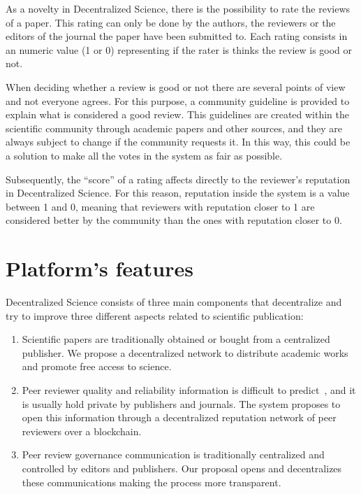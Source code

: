 \label{cha:platform-description-1}

As a novelty in Decentralized Science, there is the possibility to rate the
reviews of a paper. This rating can only be done by the authors, the reviewers
or the editors of the journal the paper have been submitted to. Each rating
consists in an numeric value (1 or 0) representing if the rater is thinks the
review is good or not.

When deciding whether a review is good or not there are several points of
view~\cite{daniel1993guardians,cole1979fair} and not everyone agrees. For this
purpose, a community guideline is provided to explain what is considered a good
review. This guidelines are created within the scientific community through
academic papers and other sources, and they are always subject to change if the
community requests it. In this way, this could be a solution to make all the
votes in the system as fair as possible.

Subsequently, the ``score'' of a rating affects directly to the reviewer's
reputation in Decentralized Science. For this reason, reputation inside the
system is a value between 1 and 0, meaning that reviewers with reputation closer
to 1 are considered better by the community than the ones with reputation closer
to 0.


\section{Platform's features}

Decentralized Science consists of three main components that decentralize and
try to improve three different aspects related to scientific publication:
\begin{enumerate}

  
\item Scientific papers are traditionally obtained or bought from a centralized
  publisher. We propose a decentralized network to distribute academic works and
  promote free access to science.

  
\item Peer reviewer quality and reliability information is difficult to
  predict~\cite{callaham_relationship_2007}, and it is usually hold private by
  publishers and journals. The system proposes to open this information through
  a decentralized reputation network of peer reviewers over a blockchain.


\item Peer review governance communication is traditionally centralized and
  controlled by editors and publishers. Our proposal opens and decentralizes
  these communications making the process more transparent.

\end{enumerate}

